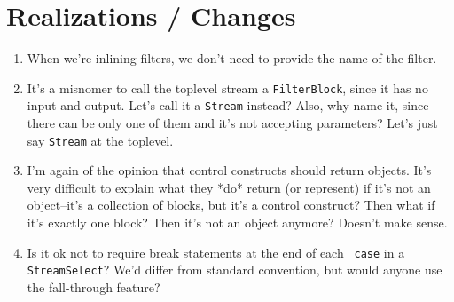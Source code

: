 \section{Realizations / Changes}

\begin{enumerate}

\item When we're inlining filters, we don't need to provide the name
of the filter.

\item It's a misnomer to call the toplevel stream a {\tt FilterBlock},
since it has no input and output.  Let's call it a {\tt Stream}
instead?  Also, why name it, since there can be only one of them and
it's not accepting parameters?  Let's just say {\tt Stream} at the
toplevel.

\item I'm again of the opinion that control constructs should return
objects.  It's very difficult to explain what they *do* return (or
represent) if it's not an object--it's a collection of blocks, but
it's a control construct?  Then what if it's exactly one block?  Then
it's not an object anymore?  Doesn't make sense.

\item Is it ok not to require break statements at the end of each {\tt
case} in a {\tt StreamSelect}?  We'd differ from standard convention,
but would anyone use the fall-through feature?

\end{enumerate}


